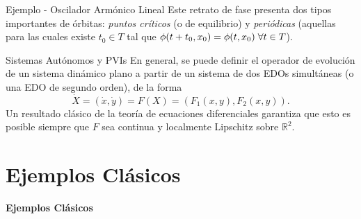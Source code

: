 \documentclass{beamer}
\newcommand{\R}{{\ensuremath{\mathbb{R}}}}
\newcommand{\stframe}[1]{\begin{frame} \begin{center}\Large{\textbf{{#1}}}\end{center}\end{frame}}
\begin{document}
\begin{frame}{Ejemplo - Oscilador Armónico Lineal}
Este retrato de fase presenta dos tipos importantes de órbitas: \emph{puntos críticos} (o de equilibrio) y \emph{periódicas} (aquellas para las cuales existe $t_0 \in T$ tal que $\phi(t+t_0, x_0) = \phi(t,x_0) \hspace{0.1cm} \forall t \in T$).
\end{frame}

\begin{frame}{Sistemas Autónomos y PVIs}
En general, se puede definir el operador de evolución de un sistema dinámico plano a partir de un sistema de dos EDOs simultáneas (o una EDO de segundo orden), de la forma
$$\dot{X} = (\dot{x}, \dot{y}) = F(X) = (F_1(x,y), F_2(x,y)). $$
Un resultado clásico de la teoría de ecuaciones diferenciales garantiza que esto es posible siempre que $F$ sea continua y localmente Lipschitz sobre $\R^2$.
\end{frame}

%
%
%
%
%
%
%


\section{Ejemplos Clásicos}
\stframe{Ejemplos Clásicos}
\end{document}
